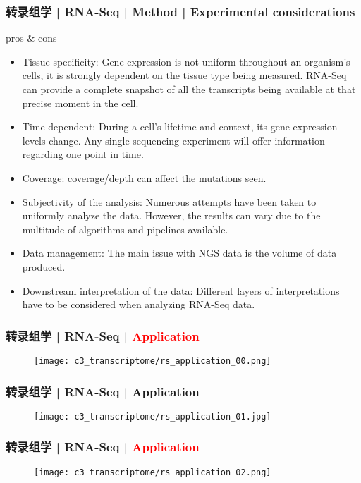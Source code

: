 \begin{frame}
  \frametitle{转录组学 | RNA-Seq | Method | Experimental considerations}
  {\footnotesize
  \begin{block}{pros \& cons}
    \begin{itemize}
      \item Tissue specificity: Gene expression is not uniform throughout an organism's cells, it is strongly dependent on the tissue type being measured. RNA-Seq can provide a complete snapshot of all the transcripts being available at that precise moment in the cell.
      \item Time dependent: During a cell's lifetime and context, its gene expression levels change. Any single sequencing experiment will offer information regarding one point in time.
      \item Coverage: coverage/depth can affect the mutations seen.
      \item Subjectivity of the analysis: Numerous attempts have been taken to uniformly analyze the data. However, the results can vary due to the multitude of algorithms and pipelines available.
      \item Data management: The main issue with NGS data is the volume of data produced.
      \item Downstream interpretation of the data: Different layers of interpretations have to be considered when analyzing RNA-Seq data.
    \end{itemize}
  \end{block}
  }
\end{frame}

\begin{frame}
  \frametitle{转录组学 | RNA-Seq | \textcolor{red}{Application}}
  \begin{figure}
    \centering
    \texttt{[image: c3\_transcriptome/rs\_application\_00.png]}
  \end{figure}
\end{frame}

\begin{frame}
  \frametitle{转录组学 | RNA-Seq | Application}
  \begin{figure}
    \centering
    \texttt{[image: c3\_transcriptome/rs\_application\_01.jpg]}
  \end{figure}
\end{frame}

\begin{frame}
  \frametitle{转录组学 | RNA-Seq | \textcolor{red}{Application}}
  \begin{figure}
    \centering
    \texttt{[image: c3\_transcriptome/rs\_application\_02.png]}
  \end{figure}
\end{frame}

